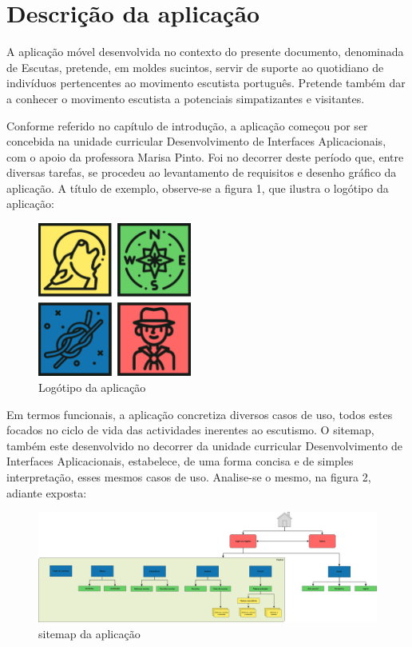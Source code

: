 \documentclass[12pt]{report}
\begin{document}
\clearpage

\section{Descrição da aplicação}

A aplicação móvel desenvolvida no contexto do presente documento, denominada de Escutas, pretende, em moldes sucintos, servir de suporte ao quotidiano de indivíduos pertencentes ao movimento escutista português. Pretende também dar a conhecer o movimento escutista a potenciais simpatizantes e visitantes.

Conforme referido no capítulo de introdução, a aplicação começou por ser concebida na unidade curricular Desenvolvimento de Interfaces Aplicacionais, com o apoio da professora Marisa Pinto. Foi no decorrer deste período que, entre diversas tarefas, se procedeu ao levantamento de requisitos e desenho gráfico da aplicação. A título de exemplo, observe-se a figura 1, que ilustra o logótipo da aplicação:

\bigskip
\begin{figure}[H]
    \centering
    \includegraphics[width=0.45\textwidth]{logo.png}
    \caption{Logótipo da aplicação}
\end{figure}

Em termos funcionais, a aplicação concretiza diversos casos de uso, todos estes focados no ciclo de vida das actividades inerentes ao escutismo. O \gls{sitemap}, também este desenvolvido no decorrer da unidade curricular Desenvolvimento de Interfaces Aplicacionais, estabelece, de uma forma concisa e de simples interpretação, esses mesmos casos de uso. Analise-se o mesmo, na figura 2, adiante exposta:

\begin{figure}[H]
    \centering
    \includegraphics[width=1\textwidth]{sitemap.png}
    \caption{\gls{sitemap} da aplicação}
\end{figure}
\end{document}
